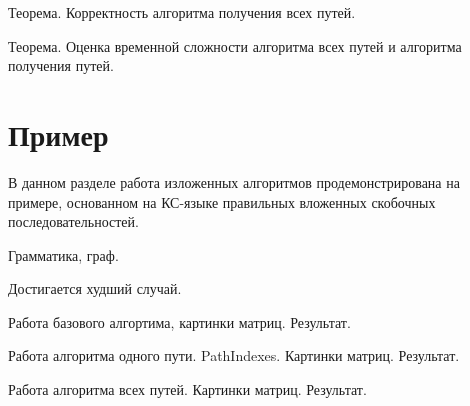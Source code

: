 Теорема. Корректность алгоритма получения всех путей.

Теорема. Оценка временной сложности алгоритма всех путей и алгоритма получения путей.

\section{Пример}\label{sec:ch3/sect3}
В данном разделе работа изложенных алгоритмов продемонстрирована на примере, основанном на КС-языке правильных вложенных скобочных последовательностей.

Грамматика, граф.

Достигается худший случай.

Работа базового алгортима, картинки матриц. Результат.

Работа алгоритма одного пути. PathIndexes. Картинки матриц. Результат.

Работа алгоритма всех путей. Картинки матриц. Результат.

\clearpage
